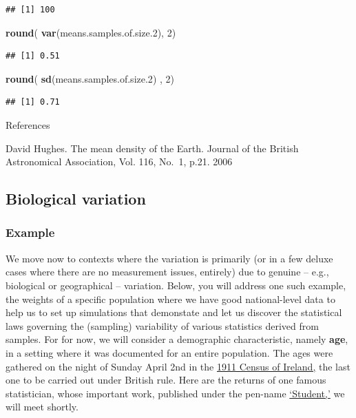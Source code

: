\documentclass[]{book}
\newenvironment{Shaded}{\begin{snugshade}}{\end{snugshade}}
\newcommand{\DecValTok}[1]{\textcolor[rgb]{0.00,0.00,0.81}{#1}}
\newcommand{\FloatTok}[1]{\textcolor[rgb]{0.00,0.00,0.81}{#1}}
\newcommand{\KeywordTok}[1]{\textcolor[rgb]{0.13,0.29,0.53}{\textbf{#1}}}
\newcommand{\NormalTok}[1]{#1}
\begin{document}
\begin{verbatim}
## [1] 100
\end{verbatim}

\begin{Shaded}
\begin{Highlighting}[]
\KeywordTok{round}\NormalTok{( }\KeywordTok{var}\NormalTok{(means.samples.of.size}\FloatTok{.2}\NormalTok{), }\DecValTok{2}\NormalTok{)}
\end{Highlighting}
\end{Shaded}

\begin{verbatim}
## [1] 0.51
\end{verbatim}

\begin{Shaded}
\begin{Highlighting}[]
\KeywordTok{round}\NormalTok{( }\KeywordTok{sd}\NormalTok{(means.samples.of.size}\FloatTok{.2}\NormalTok{) , }\DecValTok{2}\NormalTok{)}
\end{Highlighting}
\end{Shaded}

\begin{verbatim}
## [1] 0.71
\end{verbatim}

References

David Hughes. The mean density of the Earth.
Journal of the British Astronomical Association, Vol. 116, No.~1, p.21. 2006

\hypertarget{biological-variation}{%
\subsection{Biological variation}\label{biological-variation}}

\hypertarget{example}{%
\subsubsection{Example}\label{example}}

We move now to contexts where the variation is primarily (or in a few deluxe cases where there are no measurement issues, entirely) due to genuine -- e.g., biological or geographical -- variation.
Below, you will address one such example, the weights of a specific population where we have good national-level data to help us to set up simulations that demonstate and let us discover the statistical laws governing the (sampling) variability of various statistics derived from samples. For for now, we will consider a demographic characteristic, namely \textbf{age}, in a setting where it was documented for an entire population. The ages were gathered on the night of Sunday April 2nd in the \href{http://www.census.nationalarchives.ie/help/about19011911census.html}{1911 Census of Ireland,} the last one to be carried out under British rule.
Here are the returns of one famous statistician, whose important work, published under the pen-name \href{http://www.census.nationalarchives.ie/reels/nai000230598/}{`Student,'} we will meet shortly.
\end{document}
